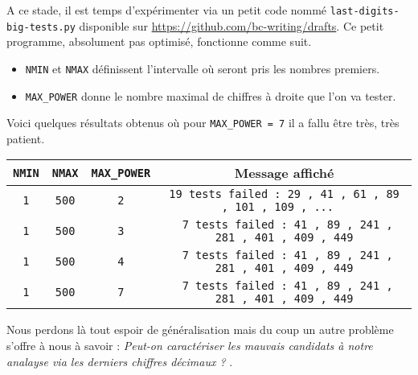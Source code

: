 A ce stade, il est temps d'expérimenter via un petit code nommé \verb+last-digits-big-tests.py+ disponible sur \url{https://github.com/bc-writing/drafts}.
Ce petit programme, absolument pas optimisé, fonctionne comme suit.

\begin{itemize}[label=\small\textbullet]
	\item \verb+NMIN+ et \verb+NMAX+ définissent l'intervalle où seront pris les nombres premiers.

	\item \verb+MAX_POWER+ donne le nombre maximal de chiffres à droite que l'on va tester.
\end{itemize}

Voici quelques résultats obtenus où pour \verb+MAX_POWER = 7+ il a fallu être très, très patient.

\begin{center}
\begin{tabular}{|c|c|c|c|}
	\hline
	\verb+NMIN+ & \verb+NMAX+ & \verb+MAX_POWER+
    & Message affiché
	\\
	\hline
    \verb+1+ & \verb+500+ & \verb+2+
    & \verb+19 tests failed : 29 , 41 , 61 , 89 , 101 , 109 , ...  +
	\\
	\hline
    \verb+1+ & \verb+500+ & \verb+3+
    & \verb+ 7 tests failed : 41 , 89 , 241 , 281 , 401 , 409 , 449+
	\\
	\hline
    \verb+1+ & \verb+500+ & \verb+4+
    & \verb+ 7 tests failed : 41 , 89 , 241 , 281 , 401 , 409 , 449+
	\\
	\hline
    \verb+1+ & \verb+500+ & \verb+7+
    & \verb+ 7 tests failed : 41 , 89 , 241 , 281 , 401 , 409 , 449+
	\\
	\hline
\end{tabular}
\end{center}


\medskip

Nous perdons là tout espoir de généralisation mais du coup un autre problème s'offre à nous à savoir : \emph{\og Peut-on caractériser les mauvais candidats à notre analayse via les derniers chiffres décimaux ? \fg}.
